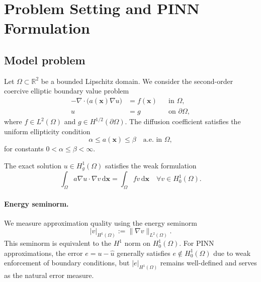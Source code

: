 \section{Problem Setting and PINN Formulation}\label{sec:methodology}

\subsection{Model problem}

Let $\Omega \subset \mathbb{R}^2$ be a bounded Lipschitz domain. We consider the
second-order coercive elliptic boundary value problem
\begin{equation}\label{eq:model-problem}
\begin{aligned}
- \nabla \cdot \bigl(a(\bm{x}) \nabla u\bigr) &= f(\bm{x}) && \text{in } \Omega,\\
u &= g && \text{on } \partial\Omega,
\end{aligned}
\end{equation}
where $f \in L^2(\Omega)$ and $g \in H^{1/2}(\partial\Omega)$.
The diffusion coefficient satisfies the uniform ellipticity condition
\begin{equation}\label{eq:ellipticity}
\alpha \le a(\bm{x}) \le \beta \quad \text{a.e. in } \Omega,
\end{equation}
for constants $0 < \alpha \le \beta < \infty$.

The exact solution $u \in H^1_g(\Omega)$ satisfies the weak formulation
\begin{equation}\label{eq:weak-form}
\int_\Omega a \nabla u \cdot \nabla v \, \mathrm{d}\bm{x}
=
\int_\Omega f v \, \mathrm{d}\bm{x}
\quad \forall v \in H^1_0(\Omega).
\end{equation}

\paragraph{Energy seminorm.}
We measure approximation quality using the energy seminorm
\begin{equation}\label{eq:energy-seminorm}
|v|_{H^1(\Omega)} := \|\nabla v\|_{L^2(\Omega)}.
\end{equation}
This seminorm is equivalent to the $H^1$ norm on $H^1_0(\Omega)$.
For PINN approximations, the error $e = u - \hat{u}$ generally satisfies
$e \notin H^1_0(\Omega)$ due to weak enforcement of boundary conditions,
but $|e|_{H^1(\Omega)}$ remains well-defined and serves as the natural
error measure.

